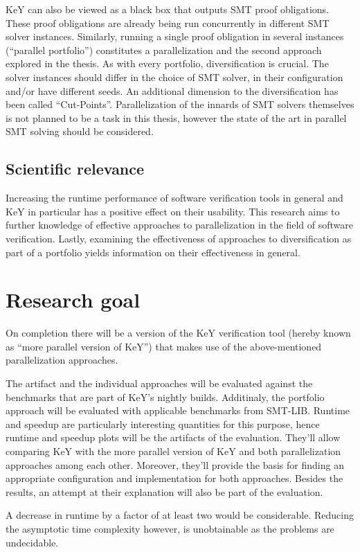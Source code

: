 \documentclass{scrartcl}
\begin{document}
KeY can also be viewed as a black box that outputs SMT proof obligations.
These proof obligations are already being run concurrently in different SMT solver instances.
Similarly, running a single proof obligation in several instances (\enquote{parallel portfolio})
constitutes a parallelization and the second approach explored in the thesis.
As with every portfolio, diversification is crucial.
The solver instances should differ in the choice of SMT solver,
in their configuration and/or have different seeds.
An additional dimension to the diversification has been called \enquote{Cut-Points}.
Parallelization of the innards of SMT solvers themselves is not planned to be a task in this thesis,
however the state of the art in parallel SMT solving should be considered.

\subsection{Scientific relevance}
Increasing the runtime performance of software verification tools in general and KeY in particular
has a positive effect on their usability.
This research aims to further knowledge of effective approaches to parallelization
in the field of software verification.
Lastly, examining the effectiveness of approaches to diversification as part of a portfolio
yields information on their effectiveness in general.

\section{Research goal}
On completion there will be a version of the KeY verification tool
(hereby known as \enquote{more parallel version of KeY})
that makes use of the above-mentioned parallelization approaches.

The artifact and the individual approaches will be evaluated
against the benchmarks that are part of KeY's nightly builds.
Additinaly, the portfolio approach will be evaluated with applicable benchmarks from
SMT-LIB.
Runtime and speedup are particularly interesting quantities for this purpose,
hence runtime and speedup plots will be the artifacts of the evaluation.
They'll allow comparing KeY with the more parallel version of KeY and
both parallelization approaches among each other.
Moreover, they'll provide the basis for finding an appropriate configuration
and implementation for both approaches.
Besides the results, an attempt at their explanation will also be part of the evaluation.

A decrease in runtime by a factor of at least two would be considerable.
Reducing the asymptotic time complexity however, is unobtainable
as the problems are undecidable.
\end{document}
